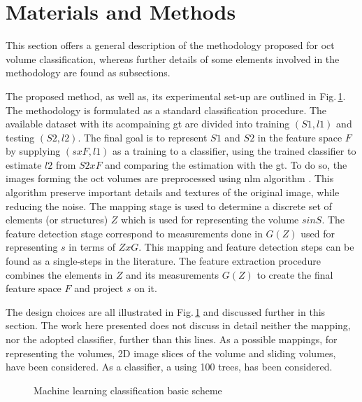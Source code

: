 \graphicspath{ {./content/method/figures/}}

\section{Materials and Methods}

 This section offers a general description of the methodology proposed for \ac{oct} volume classification, whereas further details of some elements involved in the methodology are found as subsections.
  
  The proposed method, as well as, its experimental set-up are outlined in Fig.\,\ref{fig:ML-scheme}.
  The methodology is formulated as a standard classification procedure.
  The available dataset with its acompaining \ac{gt} are divided into training $(S1,l1)$ and testing $(S2,l2)$. 
  The final goal is to represent $S1$ and $S2$ in the feature space $F$ by supplying $(sxF,l1)$ as a training to a classifier, using the trained classifier to estimate $l2$ from $S2xF$ and comparing the estimation with the \ac{gt}.
  To do so, the images forming the \ac{oct} volumes are preprocessed using \ac{nlm} algorithm \cite{buades2005non}. This algorithm preserve important details and textures of the original image, while reducing the noise.
   The mapping stage is used to determine a discrete set of elements (or structures) $Z$  which is used for representing the volume $s  in S$.
   The feature detection stage correspond to measurements done in $G(Z)$ used for representing $s$ in terms of $ZxG$. 
   This mapping and feature detection steps can be found as a single-steps in the literature.
   The feature extraction procedure combines the elements in $Z$ and its measurements $G(Z)$ to create the final feature space $F$ and project $s$ on it.
   
   The design choices are all illustrated in Fig.\,\ref{fig:ML-scheme} and discussed further in this section. The work here presented does not discuss in detail neither the mapping, nor the adopted classifier, further than this lines.
   As a possible mappings, for representing the volumes, 2D image slices of the volume and \color{red}{7x7x7}\color{black} sliding volumes, have been considered. 
   As a classifier, a \color{red}{Random Forest}\color{black} using 100 trees, has been considered.
   
\begin{figure}[h]
  \caption{Machine learning classification basic scheme}
  \label{fig:ML-scheme}
\end{figure}

